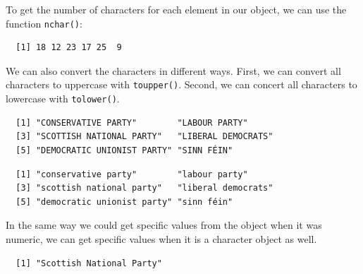 \documentclass[12pt,oneside]{reedthesis}
\theoremstyle{definition}
\theoremstyle{definition}
\theoremstyle{definition}
\theoremstyle{remark}
\begin{document}
  To get the number of characters for each element in our object, we can
  use the function \texttt{nchar()}:
  \begin{Shaded}
  \begin{Highlighting}[]
  \end{Highlighting}
  \end{Shaded}
  \begin{verbatim}
  [1] 18 12 23 17 25  9
  \end{verbatim}
  We can also convert the characters in different ways. First, we can
  convert all characters to uppercase with \texttt{toupper()}. Second, we
  can concert all characters to lowercase with \texttt{tolower()}.
  \begin{Shaded}
  \begin{Highlighting}[]
  \end{Highlighting}
  \end{Shaded}
  \begin{verbatim}
  [1] "CONSERVATIVE PARTY"        "LABOUR PARTY"             
  [3] "SCOTTISH NATIONAL PARTY"   "LIBERAL DEMOCRATS"        
  [5] "DEMOCRATIC UNIONIST PARTY" "SINN FÉIN"                
  \end{verbatim}
  \begin{Shaded}
  \begin{Highlighting}[]
  \end{Highlighting}
  \end{Shaded}
  \begin{verbatim}
  [1] "conservative party"        "labour party"             
  [3] "scottish national party"   "liberal democrats"        
  [5] "democratic unionist party" "sinn féin"                
  \end{verbatim}
  In the same way we could get specific values from the object when it was
  numeric, we can get specific values when it is a character object as
  well.
  \begin{Shaded}
  \begin{Highlighting}[]
  \NormalTok{p[}\NormalTok{]}
  \end{Highlighting}
  \end{Shaded}
  \begin{verbatim}
  [1] "Scottish National Party"
  \end{verbatim}
  \begin{Shaded}
  \begin{Highlighting}[]
  \NormalTok{p[}\OperatorTok{-}\NormalTok{]}
  \end{Highlighting}
  \end{Shaded}
\end{document}

